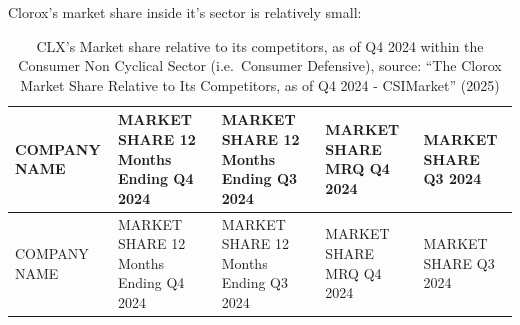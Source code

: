 \documentclass[
  letterpaper,
  DIV=11,
  numbers=noendperiod]{scrartcl}
\begin{document}
Clorox's market share inside it's sector is relatively small:

\begin{longtable}[]{@{}
  >{\raggedright\arraybackslash}p{}
  >{\raggedright\arraybackslash}p{}
  >{\raggedright\arraybackslash}p{}
  >{\raggedright\arraybackslash}p{}
  >{\raggedright\arraybackslash}p{}@{}}
\caption{CLX's Market share relative to its competitors, as of Q4 2024
within the Consumer Non Cyclical Sector (i.e.~Consumer Defensive),
source: {``The {Clorox Market} Share Relative to Its Competitors, as of
{Q4} 2024 - {CSIMarket}''} (2025)}\tabularnewline
\toprule\noalign{}
\begin{minipage}[b]{\linewidth}\raggedright
COMPANY NAME
\end{minipage} & \begin{minipage}[b]{\linewidth}\raggedright
MARKET SHARE 12 Months Ending Q4 2024
\end{minipage} & \begin{minipage}[b]{\linewidth}\raggedright
MARKET SHARE 12 Months Ending Q3 2024
\end{minipage} & \begin{minipage}[b]{\linewidth}\raggedright
MARKET SHARE MRQ Q4 2024
\end{minipage} & \begin{minipage}[b]{\linewidth}\raggedright
MARKET SHARE Q3 2024
\end{minipage} \\
\midrule\noalign{}
\endfirsthead
\toprule\noalign{}
\begin{minipage}[b]{\linewidth}\raggedright
COMPANY NAME
\end{minipage} & \begin{minipage}[b]{\linewidth}\raggedright
MARKET SHARE 12 Months Ending Q4 2024
\end{minipage} & \begin{minipage}[b]{\linewidth}\raggedright
MARKET SHARE 12 Months Ending Q3 2024
\end{minipage} & \begin{minipage}[b]{\linewidth}\raggedright
MARKET SHARE MRQ Q4 2024
\end{minipage} & \begin{minipage}[b]{\linewidth}\raggedright
MARKET SHARE Q3 2024
\end{minipage} \\

\end{longtable}
\end{document}
